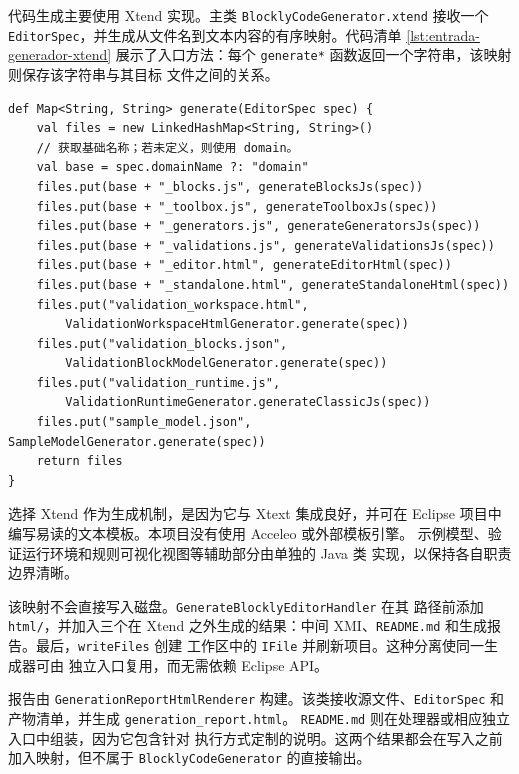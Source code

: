 代码生成主要使用 Xtend 实现。主类
\texttt{Blockly\allowbreak{}Code\allowbreak{}Generator.xtend} 接收一个
\texttt{EditorSpec}，并生成从文件名到文本内容的有序映射。代码清单
\ref{lst:entrada-generador-xtend} 展示了入口方法：每个
\texttt{generate*} 函数返回一个字符串，该映射则保存该字符串与其目标
文件之间的关系。

\begin{lstlisting}[style=tfmxtend, captionpos=t, caption={\texttt{BlocklyCodeGenerator.xtend} 的生成入口}, label={lst:entrada-generador-xtend}]
def Map<String, String> generate(EditorSpec spec) {
    val files = new LinkedHashMap<String, String>()
    // 获取基础名称；若未定义，则使用 domain。
    val base = spec.domainName ?: "domain"
    files.put(base + "_blocks.js", generateBlocksJs(spec))
    files.put(base + "_toolbox.js", generateToolboxJs(spec))
    files.put(base + "_generators.js", generateGeneratorsJs(spec))
    files.put(base + "_validations.js", generateValidationsJs(spec))
    files.put(base + "_editor.html", generateEditorHtml(spec))
    files.put(base + "_standalone.html", generateStandaloneHtml(spec))
    files.put("validation_workspace.html",
        ValidationWorkspaceHtmlGenerator.generate(spec))
    files.put("validation_blocks.json",
        ValidationBlockModelGenerator.generate(spec))
    files.put("validation_runtime.js",
        ValidationRuntimeGenerator.generateClassicJs(spec))
    files.put("sample_model.json", SampleModelGenerator.generate(spec))
    return files
}
\end{lstlisting}

选择 Xtend 作为生成机制，是因为它与 Xtext 集成良好，并可在 Eclipse
项目中编写易读的文本模板。本项目没有使用 Acceleo 或外部模板引擎。
示例模型、验证运行环境和规则可视化视图等辅助部分由单独的 Java 类
实现，以保持各自职责边界清晰。

该映射不会直接写入磁盘。\texttt{GenerateBlocklyEditorHandler} 在其
路径前添加 \texttt{html/}，并加入三个在 Xtend 之外生成的结果：中间
XMI、\texttt{README.md} 和生成报告。最后，\texttt{writeFiles} 创建
工作区中的 \texttt{IFile} 并刷新项目。这种分离使同一生成器可由
独立入口复用，而无需依赖 Eclipse API。

报告由 \texttt{GenerationReport}\allowbreak\texttt{HtmlRenderer}
构建。该类接收源文件、\texttt{EditorSpec} 和产物清单，并生成
\texttt{generation\_}\allowbreak\texttt{report.html}。
\texttt{README.md} 则在处理器或相应独立入口中组装，因为它包含针对
执行方式定制的说明。这两个结果都会在写入之前加入映射，但不属于
\texttt{BlocklyCodeGenerator} 的直接输出。

